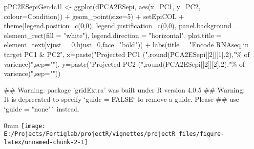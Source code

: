 \documentclass[]{article}
\newcommand{\hlnum}[1]{\textcolor[rgb]{0.816,0.125,0.439}{#1}}%
\newcommand{\hlstr}[1]{\textcolor[rgb]{0.251,0.627,0.251}{#1}}%
\newcommand{\hlopt}[1]{\textcolor[rgb]{0,0,0}{#1}}%
\newcommand{\hlstd}[1]{\textcolor[rgb]{0.251,0.251,0.251}{#1}}%
\newcommand{\hlkwc}[1]{\textcolor[rgb]{0.251,0.251,0.251}{#1}}%
\newcommand{\hlkwd}[1]{\textcolor[rgb]{0.878,0.439,0.125}{#1}}%
\newenvironment{Shaded}{\begin{myshaded}}{\end{myshaded}}
\renewenvironment{verbatim}{\color{codecolor}\begin{myshaded}\begin{oldverbatim}}{\end{oldverbatim}\end{myshaded}}
\newcommand{\KeywordTok}[1]{\hlkwd{#1}}
\newcommand{\DataTypeTok}[1]{\hlkwc{#1}}
\newcommand{\DecValTok}[1]{\hlnum{#1}}
\newcommand{\StringTok}[1]{\hlstr{#1}}
\newcommand{\OperatorTok}[1]{\hlopt{#1}}
\newcommand{\NormalTok}[1]{\hlstd{#1}}
\begin{document}
\begin{Shaded}
\begin{Highlighting}[]
\NormalTok{pPC2ESepiGen4c1l <{-}}\StringTok{ }\KeywordTok{ggplot}\NormalTok{(dPCA2ESepi, }\KeywordTok{aes}\NormalTok{(}\DataTypeTok{x=}\NormalTok{PC1, }\DataTypeTok{y=}\NormalTok{PC2, }\DataTypeTok{colour=}\NormalTok{Condition)) }\OperatorTok{+}
\StringTok{  }\KeywordTok{geom\_point}\NormalTok{(}\DataTypeTok{size=}\DecValTok{5}\NormalTok{) }\OperatorTok{+}\StringTok{ }\NormalTok{setEpiCOL }\OperatorTok{+}
\StringTok{  }\KeywordTok{theme}\NormalTok{(}\DataTypeTok{legend.position=}\KeywordTok{c}\NormalTok{(}\DecValTok{0}\NormalTok{,}\DecValTok{0}\NormalTok{), }\DataTypeTok{legend.justification=}\KeywordTok{c}\NormalTok{(}\DecValTok{0}\NormalTok{,}\DecValTok{0}\NormalTok{),}
  \DataTypeTok{panel.background =} \KeywordTok{element\_rect}\NormalTok{(}\DataTypeTok{fill =} \StringTok{"white"}\NormalTok{),}
  \DataTypeTok{legend.direction =} \StringTok{"horizontal"}\NormalTok{,}
  \DataTypeTok{plot.title =} \KeywordTok{element\_text}\NormalTok{(}\DataTypeTok{vjust =} \DecValTok{0}\NormalTok{,}\DataTypeTok{hjust=}\DecValTok{0}\NormalTok{,}\DataTypeTok{face=}\StringTok{"bold"}\NormalTok{)) }\OperatorTok{+}
\StringTok{  }\KeywordTok{labs}\NormalTok{(}\DataTypeTok{title =} \StringTok{"Encode RNAseq in target PC1 \& PC2"}\NormalTok{,}
  \DataTypeTok{x=}\KeywordTok{paste}\NormalTok{(}\StringTok{"Projected PC1 ("}\NormalTok{,}\KeywordTok{round}\NormalTok{(PCA2ESepi[[}\DecValTok{2}\NormalTok{]][}\DecValTok{1}\NormalTok{],}\DecValTok{2}\NormalTok{),}\StringTok{"\% of varience)"}\NormalTok{,}\DataTypeTok{sep=}\StringTok{""}\NormalTok{),}
  \DataTypeTok{y=}\KeywordTok{paste}\NormalTok{(}\StringTok{"Projected PC2 ("}\NormalTok{,}\KeywordTok{round}\NormalTok{(PCA2ESepi[[}\DecValTok{2}\NormalTok{]][}\DecValTok{2}\NormalTok{],}\DecValTok{2}\NormalTok{),}\StringTok{"\% of varience)"}\NormalTok{,}\DataTypeTok{sep=}\StringTok{""}\NormalTok{))}
\end{Highlighting}
\end{Shaded}

\begin{verbatim}
## Warning: package 'gridExtra' was built under R version 4.0.5
## Warning: It is deprecated to specify `guide = FALSE` to remove a guide. Please
## use `guide = "none"` instead.
\end{verbatim}

\begin{adjustwidth}{\fltoffset}{0mm}
\texttt{[image: E:/Projects/Fertiglab/projectR/vignettes/projectR\_files/figure-latex/unnamed-chunk-2-1]} \end{adjustwidth}
\end{document}
